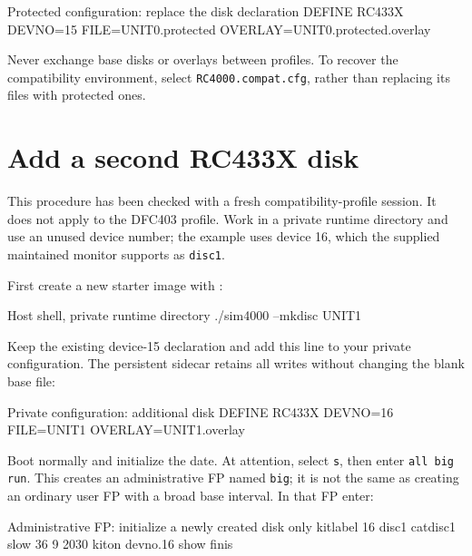 \begin{commandexample}{Protected configuration: replace the disk declaration}
DEFINE RC433X DEVNO=15 FILE=UNIT0.protected OVERLAY=UNIT0.protected.overlay
\end{commandexample}

Never exchange base disks or overlays between profiles. To recover the
compatibility environment, select \texttt{RC4000.compat.cfg}, rather than
replacing its files with protected ones.

\section{Add a second RC433X disk}\label{add-a-second-rc433x-disk}

This procedure has been checked with a fresh compatibility-profile session.
It does not apply to the DFC403 profile. Work in a private runtime directory
and use an unused device number; the example uses device 16, which the supplied
maintained monitor supports as \texttt{disc1}.

First create a new starter image with
:

\begin{commandexample}[language=sh]{Host shell, private runtime directory}
./sim4000 --mkdisc UNIT1
\end{commandexample}

Keep the existing device-15 declaration and add this line to your private
configuration. The persistent sidecar retains all writes without changing
the blank base file:

\begin{commandexample}{Private configuration: additional disk}
DEFINE RC433X DEVNO=16 FILE=UNIT1 OVERLAY=UNIT1.overlay
\end{commandexample}

Boot normally and initialize the date. At attention, select \texttt{s}, then
enter \texttt{all big run}. This creates an administrative FP named
\texttt{big}; it is not the same as creating an ordinary user FP with a broad
base interval. In that FP enter:

\begin{commandexample}{Administrative FP: initialize a newly created disk only}
kitlabel 16 disc1 catdisc1 slow 36 9 2030
kiton devno.16
show
finis
\end{commandexample}

